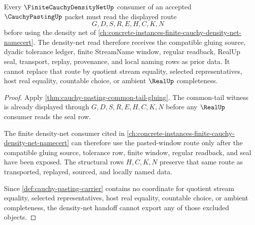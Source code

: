 \begin{theorem}
\label{thm:cauchy-pasting-density-net-forward-link}
Every $\FiniteCauchyDensityNetUp$ consumer of an accepted $\CauchyPastingUp$ packet must read the displayed route
$$
G,D,S,R,E,H,C,K,N
$$
before using the density net of \autoref{ch:concrete-instances-finite-cauchy-density-net-namecert}. The density-net read therefore receives the compatible gluing source, dyadic tolerance ledger, finite StreamName window, regular readback, RealUp seal, transport, replay, provenance, and local naming rows as prior data. It cannot replace that route by quotient stream equality, selected representatives, host real equality, countable choice, or ambient $\RealUp$ completeness.
\end{theorem}
\begin{proof}
Apply \autoref{thm:cauchy-pasting-common-tail-gluing}. The common-tail witness is already displayed through $G,D,S,R,E,H,C,K,N$ before any $\RealUp$ consumer reads the seal row.

The finite density-net consumer cited in \autoref{ch:concrete-instances-finite-cauchy-density-net-namecert} can therefore use the pasted-window route only after the compatible gluing source, tolerance row, finite window, regular readback, and seal have been exposed. The structural rows $H,C,K,N$ preserve that same route as transported, replayed, sourced, and locally named data.

Since \autoref{def:cauchy-pasting-carrier} contains no coordinate for quotient stream equality, selected representatives, host real equality, countable choice, or ambient completeness, the density-net handoff cannot export any of those excluded objects.
\end{proof}

